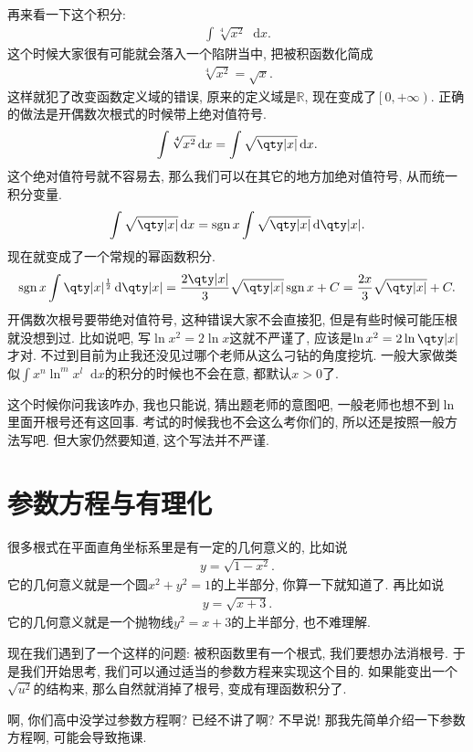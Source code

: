 \documentclass{ctexbook}
\DeclareMathOperator{\sgn}{sgn}
\newcommand*{\dif}{\mathop{}\!\mathrm{d}}
\begin{document}
{再来看一下这个积分: 
\begin{align*}
\int\sqrt[4]{x^{2}}\dif{x}
.\end{align*}
这个时候大家很有可能就会落入一个陷阱当中, 把被积函数化简成
\begin{align*}
\sqrt[4]{x^{2}}=\sqrt{x}
.\end{align*}
这样就犯了改变函数定义域的错误, 原来的定义域是$\mathbb{R}$, 现在变成了$\left[0,+\infty\right)$. 正确的做法是开偶数次根式的时候带上绝对值符号. 
\begin{align*}
\int\sqrt[4]{x^{2}}\dif{x}=\int\sqrt{\qty|x|}\dif{x}
.\end{align*}
这个绝对值符号就不容易去, 那么我们可以在其它的地方加绝对值符号, 从而统一积分变量. 
\begin{align*}
\int\sqrt{\qty|x|}\dif{x}=\sgn{x}\int\sqrt{\qty|x|}\dif{\qty|x|}
.\end{align*}
现在就变成了一个常规的幂函数积分. 
\begin{align*}
\sgn{x}\int\qty|x|^{\frac{1}{2}}\dif{\qty|x|}=\frac{2\qty|x|}{3}\sqrt{\qty|x|}\sgn{x}+C=\frac{2x}{3}\sqrt{\qty|x|}+C
.\end{align*}
开偶数次根号要带绝对值符号, 这种错误大家不会直接犯, 但是有些时候可能压根就没想到过. 比如说吧, 写$\ln{x^{2}}=2\ln{x}$这就不严谨了, 应该是$\ln{x^{2}}=2\ln\qty|x|$才对. 不过到目前为止我还没见过哪个老师从这么刁钻的角度挖坑. 一般大家做类似$\int x^{n}\ln^{m}{x^{l}}\dif{x}$的积分的时候也不会在意, 都默认$x>0$了. \par
这个时候你问我该咋办, 我也只能说, 猜出题老师的意图吧, 一般老师也想不到$\ln$里面开根号还有这回事. 考试的时候我也不会这么考你们的, 所以还是按照一般方法写吧. 但大家仍然要知道, 这个写法并不严谨. \par
\section{参数方程与有理化}
很多根式在平面直角坐标系里是有一定的几何意义的, 比如说
\begin{align*}
y=\sqrt{1-x^{2}}
.\end{align*}
它的几何意义就是一个圆$x^{2}+y^{2}=1$的上半部分, 你算一下就知道了. 再比如说
\begin{align*}
y=\sqrt{x+3}
.\end{align*}
它的几何意义就是一个抛物线$y^{2}=x+3$的上半部分, 也不难理解. \par
现在我们遇到了一个这样的问题: 被积函数里有一个根式, 我们要想办法消根号. 于是我们开始思考, 我们可以通过适当的参数方程来实现这个目的. 如果能变出一个$\sqrt{u^{2}}$的结构来, 那么自然就消掉了根号, 变成有理函数积分了. \par
啊, 你们高中没学过参数方程啊? 已经不讲了啊? 不早说! 那我先简单介绍一下参数方程啊, 可能会导致拖课. \par
}
\end{document}
